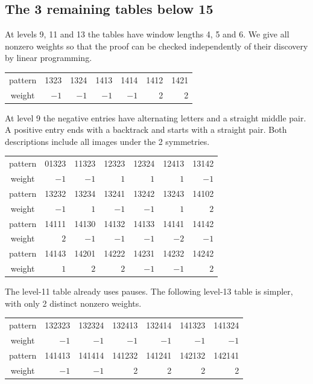 \documentclass[11pt,a4paper]{amsart}
\begin{document}
\subsection{The 3 remaining tables below 15}
At levels 9, 11 and 13 the tables have window lengths 4, 5 and 6. We give all nonzero weights so that the proof can be checked independently of their discovery by linear programming.
\begin{center}\small
\begin{tabular}{c|rrrrrr}
pattern &1323&1324&1413&1414&1412&1421\\
weight &$-1$&$-1$&$-1$&$-1$&2&2
\end{tabular}
\end{center}
At level 9 the negative entries have alternating letters and a straight middle pair. A positive entry ends with a backtrack and starts with a straight pair. Both descriptions include all images under the 2 symmetries.
\begin{center}\small
\begin{tabular}{c|rrrrrr}
pattern & 01323 & 11323 & 12323 & 12324 & 12413 & 13142\\
weight & $-1$ & $-1$ & $1$ & $1$ & $1$ & $-1$\\
\midrule
pattern & 13232 & 13234 & 13241 & 13242 & 13243 & 14102\\
weight & $-1$ & $1$ & $-1$ & $-1$ & $1$ & $2$\\
\midrule
pattern & 14111 & 14130 & 14132 & 14133 & 14141 & 14142\\
weight & $2$ & $-1$ & $-1$ & $-1$ & $-2$ & $-1$\\
\midrule
pattern & 14143 & 14201 & 14222 & 14231 & 14232 & 14242\\
weight & $1$ & $2$ & $2$ & $-1$ & $-1$ & $2$\\
\end{tabular}
\end{center}
The level-11 table already uses pauses. The following level-13 table is simpler, with only 2 distinct nonzero weights.
\begin{center}\small
\begin{tabular}{c|rrrrrr}
pattern &132323&132324&132413&132414&141323&141324\\
weight &$-1$&$-1$&$-1$&$-1$&$-1$&$-1$\\ \midrule
pattern &141413&141414&141232&141241&142132&142141\\
weight &$-1$&$-1$&2&2&2&2
\end{tabular}
\end{center}
\end{document}

